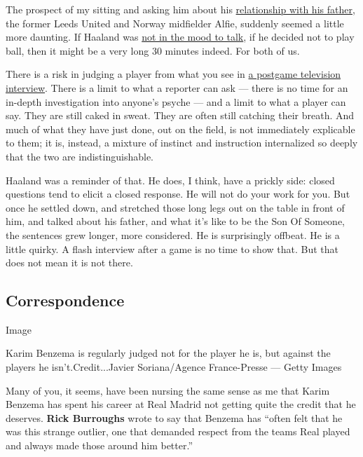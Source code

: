 The prospect of my sitting and asking him about his
\href{https://www.nytimes3xbfgragh.onion/2020/07/28/sports/soccer/erling-haaland-gio-reyna-thuram.html}{relationship
with his father}, the former Leeds United and Norway midfielder Alfie,
suddenly seemed a little more daunting. If Haaland was
\href{https://twitter.com/BBCSport/status/1263571516546969601}{not in
the mood to talk}, if he decided not to play ball, then it might be a
very long 30 minutes indeed. For both of us.

There is a risk in judging a player from what you see in
\href{https://www.youtube.com/watch?v=nqKH-_VzufQ\&feature=youtu.be}{a
postgame television interview}. There is a limit to what a reporter can
ask --- there is no time for an in-depth investigation into anyone's
psyche --- and a limit to what a player can say. They are still caked in
sweat. They are often still catching their breath. And much of what they
have just done, out on the field, is not immediately explicable to them;
it is, instead, a mixture of instinct and instruction internalized so
deeply that the two are indistinguishable.

Haaland was a reminder of that. He does, I think, have a prickly side:
closed questions tend to elicit a closed response. He will not do your
work for you. But once he settled down, and stretched those long legs
out on the table in front of him, and talked about his father, and what
it's like to be the Son Of Someone, the sentences grew longer, more
considered. He is surprisingly offbeat. He is a little quirky. A flash
interview after a game is no time to show that. But that does not mean
it is not there.

\hypertarget{correspondence}{%
\subsection{Correspondence}\label{correspondence}}

Image

Karim Benzema is regularly judged not for the player he is, but against
the players he isn't.Credit...Javier Soriana/Agence France-Presse ---
Getty Images

Many of you, it seems, have been nursing the same sense as me that Karim
Benzema has spent his career at Real Madrid not getting quite the credit
that he deserves. \textbf{Rick Burroughs} wrote to say that Benzema has
``often felt that he was this strange outlier, one that demanded respect
from the teams Real played and always made those around him better.''

